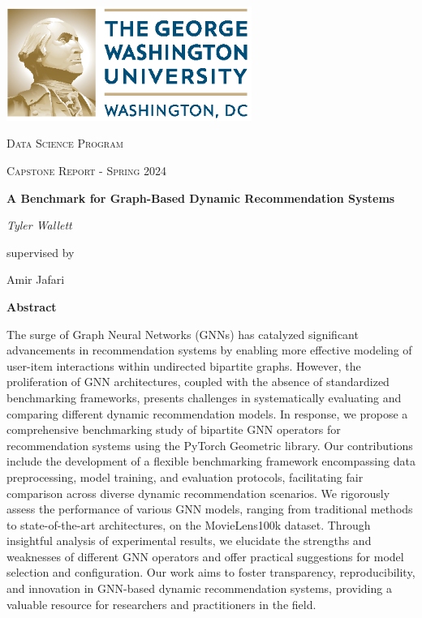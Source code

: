\documentclass{scrartcl}
\renewenvironment{abstract}{
    \centering
    \textbf{Abstract}
    \vspace{0.5cm}
    \par\itshape
    \begin{minipage}{1\linewidth}}{\end{minipage}
    \noindent\ignorespaces
}
\begin{document}
\begin{titlepage}
	\centering
	\includegraphics[width=0.6\textwidth]{GW_logo.eps}\par
	\vspace{1cm}
	{\scshape\LARGE Data Science Program \par}
	\vspace{1cm}
	{\scshape\Large Capstone Report - Spring 2024\par}
	\vspace{1cm}
	{\huge\bfseries A Benchmark for Graph-Based Dynamic Recommendation Systems\par}
	\vspace{1cm}
	{\Large\itshape Tyler Wallett\\}\par
	\vspace{1cm}
	supervised by\par
	Amir Jafari

	\vfill
	\begin{abstract}
	    \quad The surge of Graph Neural Networks (GNNs) has catalyzed significant advancements in recommendation systems by enabling more effective modeling of user-item interactions within undirected bipartite graphs. However, the proliferation of GNN architectures, coupled with the absence of standardized benchmarking frameworks, presents challenges in systematically evaluating and comparing different dynamic recommendation models. In response, we propose a comprehensive benchmarking study of bipartite GNN operators for recommendation systems using the PyTorch Geometric library. Our contributions include the development of a flexible benchmarking framework encompassing data preprocessing, model training, and evaluation protocols, facilitating fair comparison across diverse dynamic recommendation scenarios. We rigorously assess the performance of various GNN models, ranging from traditional methods to state-of-the-art architectures, on the MovieLens100k dataset. Through insightful analysis of experimental results, we elucidate the strengths and weaknesses of different GNN operators and offer practical suggestions for model selection and configuration. Our work aims to foster transparency, reproducibility, and innovation in GNN-based dynamic recommendation systems, providing a valuable resource for researchers and practitioners in the field.
	\end{abstract}
	\vfill
\end{titlepage}
\tableofcontents
\newpage
\end{document}
